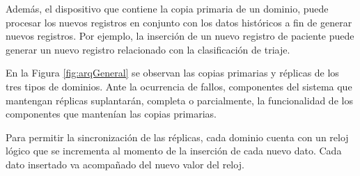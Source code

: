  Además, el dispositivo que contiene la copia primaria de un dominio, puede procesar los nuevos registros en conjunto con los datos históricos a fin de generar nuevos registros. Por ejemplo, la inserción de un nuevo registro de paciente puede generar un nuevo registro relacionado con la clasificación de triaje.
 
 En la Figura \ref{fig:arqGeneral} se observan las copias primarias y réplicas de los tres tipos de dominios. Ante la ocurrencia de fallos, componentes del sistema que mantengan réplicas suplantarán, completa o parcialmente, la funcionalidad de los componentes que mantenían las copias primarias.

 Para permitir la sincronización de las réplicas, cada dominio cuenta con un reloj lógico que se incrementa al momento de la inserción de cada nuevo dato. Cada dato insertado va acompañado del nuevo valor del reloj.





